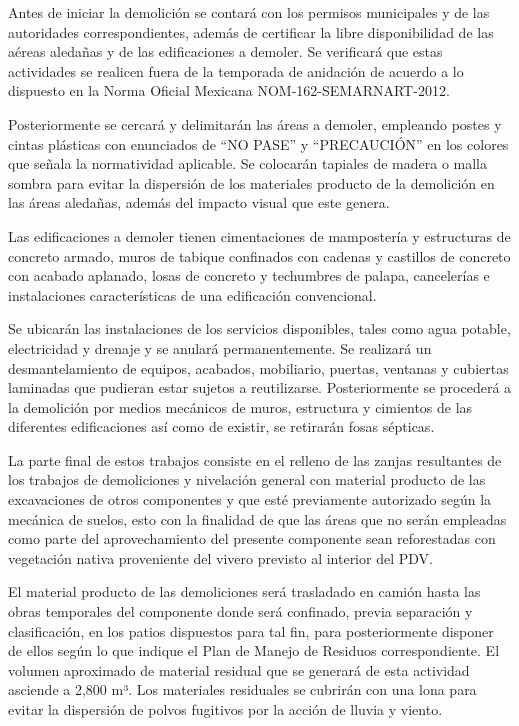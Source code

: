 \documentclass{article}
\begin{document}
Antes de iniciar la demolición se contará con los permisos municipales y de las autoridades correspondientes, además de certificar la libre disponibilidad de las aéreas aledañas y de las edificaciones a demoler. Se verificará que estas actividades se realicen fuera de la temporada de anidación de acuerdo a lo dispuesto en la Norma Oficial Mexicana NOM-162-SEMARNART-2012. 


\bigskip

Posteriormente se cercará y delimitarán las áreas a demoler, empleando postes y cintas plásticas con enunciados de “NO PASE” y “PRECAUCIÓN” en los colores que señala la normatividad aplicable. Se colocarán tapiales de madera o malla sombra para evitar la dispersión de los materiales producto de la demolición en las áreas aledañas, además del impacto visual que este genera. 


\bigskip

Las edificaciones a demoler tienen cimentaciones de mampostería y estructuras de concreto armado, muros de tabique confinados con cadenas y castillos de concreto con acabado aplanado, losas de concreto y techumbres de palapa, cancelerías e instalaciones características de una edificación convencional.


\bigskip

Se ubicarán las instalaciones de los servicios disponibles, tales como agua potable, electricidad y drenaje y se anulará permanentemente. Se realizará un desmantelamiento de equipos, acabados, mobiliario, puertas, ventanas y cubiertas laminadas que pudieran estar sujetos a reutilizarse. Posteriormente se procederá a la demolición por medios mecánicos de muros, estructura y cimientos de las diferentes edificaciones así como de existir, se retirarán fosas sépticas.

La parte final de estos trabajos consiste en el relleno de las zanjas resultantes de los trabajos de demoliciones y nivelación general con material producto de las excavaciones de otros componentes y que esté previamente autorizado según la mecánica de suelos, esto con la finalidad de que las áreas que no serán empleadas como parte del aprovechamiento del presente componente sean reforestadas con vegetación nativa proveniente del vivero previsto al interior del PDV. 


\bigskip

El material producto de las demoliciones será trasladado en camión hasta las obras temporales del componente donde será confinado, previa separación y clasificación, en los patios dispuestos para tal fin, para posteriormente disponer de ellos según lo que indique el Plan de Manejo de Residuos correspondiente. El volumen aproximado de material residual que se generará de esta actividad asciende a 2,800 m³. Los materiales residuales se cubrirán con una lona para evitar la dispersión de polvos fugitivos por la acción de lluvia y viento.
\end{document}
